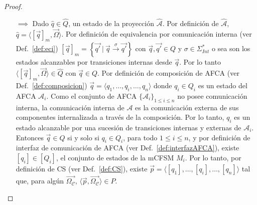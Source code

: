 \begin{proof} 
\begin{itemize}
    \item[$\implies$] Dado $\widehat{q} \in \widehat{Q}$, un estado de la proyección $\widehat{\mathcal{A}}$. Por definición de $\widehat{\mathcal{A}}$, $\widehat{q}= \langle [\overrightarrow{q}]_m, \overrightarrow{\Omega} \rangle$. Por definición de equivalencia por comunicación interna (ver Def.~\ref{def:eci}) $[\overrightarrow{q}]_m = \left\{\overrightarrow{q'}\ |\ \overrightarrow{q} \xrightarrow{\sigma}\overrightarrow{q'}\right\}$ con $\overrightarrow{q},\overrightarrow{q'} \in Q$ y $\sigma \in \Sigma_\mathit{Int}^*$ o sea son los estados alcanzables por transiciones internas desde $\overrightarrow{q}$. Por lo tanto $\langle [\overrightarrow{q}]_m, \overrightarrow{\Omega} \rangle \in \widehat{Q}$ con $\overrightarrow{q} \in Q$. Por definición de composición de AFCA (ver Def.~\ref{def:composicion}) $\overrightarrow{q} = \langle q_1, \ldots, q_i, \ldots, q_n \rangle$ donde $q_i \in Q_i$ es un estado del AFCA $\mathcal{A}_i$. Como el conjunto de AFCA $\{\mathcal{A}_i\}_{1 \leq i \leq n}$ no posee comunicación interna, la comunicación interna de $\mathcal{A}$ es la comunicación externa de sus componentes internalizada a través de la composición. Por lo tanto, $q_i$ es un estado alcanzable por una sucesión de transiciones internas y externas de $\mathcal{A}_i$. Entonces $\overrightarrow{q} \in Q$ si y solo si $q_i \in Q_i$, para todo $1 \leq i \leq n$, y por definición de interfaz de comunicación de AFCA (ver Def.~\ref{def:interfazAFCA}), existe $[q_i] \in [Q_i]$, el conjunto de estados de la mCFSM $M_i$. Por lo tanto, por definición de CS (ver Def.~\ref{def:CS}), existe $\overrightarrow{p} = \langle [q_1], \ldots, [q_i], \ldots, [q_n] \rangle$ tal que, para algún $\overrightarrow{\Omega_\mathcal{C}}$, $\langle \overrightarrow{p}, \overrightarrow{\Omega_\mathcal{C}} \rangle \in P$.\\
    

\end{itemize}
\end{proof}

